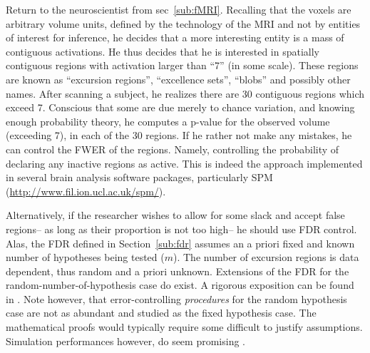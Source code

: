 \documentclass[review,12pt]{article}
\theoremstyle{definition}
\theoremstyle{definition}
\begin{document}
Return to the neuroscientist from sec~\ref{sub:fMRI}. Recalling that the voxels are arbitrary volume units, defined by the technology of the MRI and not by entities of interest for inference, he decides that a more interesting entity is a mass of contiguous activations. He thus decides that he is interested in spatially contiguous regions with activation larger than ``7'' (in some scale). These regions are known as ``excursion regions'', ``excellence sets'', ``blobs'' and possibly other names. 
After scanning a subject, he realizes there are 30 contiguous regions which exceed 7. Conscious that some are  due merely to chance variation, and knowing enough probability theory, he computes a p-value for the observed volume (exceeding 7), in each of the 30 regions. If he rather not make any mistakes, he can control the FWER of the regions. Namely, controlling the probability of declaring any inactive regions as active. This is indeed the approach implemented in several brain analysis software packages, particularly SPM (\url{http://www.fil.ion.ucl.ac.uk/spm/}).

Alternatively, if the researcher wishes to allow for some slack and accept false regions-- as long as their proportion is not too high-- he should use FDR control. Alas, the FDR defined in Section~\ref{sub:fdr} assumes an a priori fixed and known number of hypotheses being tested ($m$). The number of excursion regions is data dependent, thus random and a priori unknown. Extensions of the FDR for the random-number-of-hypothesis case do exist. A rigorous exposition can be found in  \citet{siegmund_false_2011}. Note however, that error-controlling \emph{procedures} for the random hypothesis case are not as abundant and studied as the fixed hypothesis case. The mathematical proofs would typically require some difficult to justify assumptions. Simulation performances however, do seem promising \citep{chumbley_false_2009,chumbley_topological_2010}.
\end{document}
